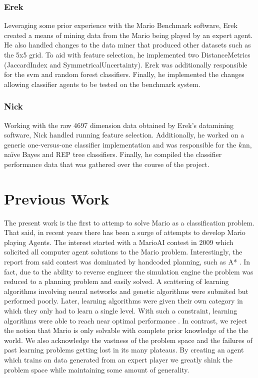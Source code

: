 \documentclass[]{article}   %
\begin{document}
\subsubsection{Erek}
Leveraging some prior experience with the Mario Benchmark software, Erek created a means of mining data from the Mario being played by an expert agent. He also handled changes to the data miner that produced other datasets such as the 5x5 grid. To aid with feature selection, he implemented two DistanceMetrics (JaccardIndex and SymmetricalUncertainty). Erek was additionally responsible for the svm and random forest classifiers. Finally, he implemented the changes allowing classifier agents to be tested on the benchmark system.

\subsubsection{Nick}
Working with the raw 4697 dimension data obtained by Erek's datamining software, Nick handled running feature selection. Additionally, he worked on a generic one-versus-one classifier implementation and was responsible for the $k$nn, na\"{i}ve Bayes and REP tree classifiers. Finally, he compiled the classifier performance data that was gathered over the course of the project.

\section{Previous Work}
\label{sec:prevwork}
The present work is the first to attemp to solve Mario as a classification problem.  That said, in recent years there has been a surge of attempts to develop Mario playing Agents.  The interest started with a MarioAI contest in 2009 which solicited all computer agent solutions to the Mario problem.  Interestingly, the report from said contest was dominated by handcoded planning, such as A* \cite{marioaicompetiton}.  In fact, due to the ability to reverse engineer the simulation engine the problem was reduced to a planning problem and easily solved.  A scattering of learning algorithms involving neural networks and genetic algorithms were submited but performed poorly.  Later, learning algorithms were given their own category in which they only had to learn a single level. With such a constraint, learning algorithms were able to reach near optimal performance \cite{speed}. In contrast, we reject the notion that Mario is only solvable with complete prior knowledge of the the world.  We also acknowledge the vastness of the problem space and the failures of past learning problems getting lost in its many plateaus.  By creating an agent which trains on data generated from an expert player we greatly shink the problem space while maintaining some amount of generality.  
\end{document}
